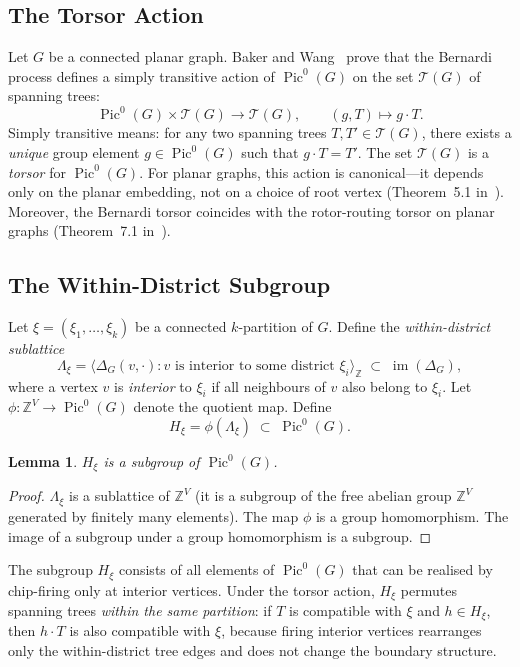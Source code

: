 \documentclass[11pt]{article}
\newtheorem{lemma}{Lemma}[section]
\newcommand{\Z}{\mathbb{Z}}
\newcommand{\Pic}{\operatorname{Pic}^0}
\newcommand{\im}{\operatorname{im}}
\begin{document}
\subsection{The Torsor Action}

Let $G$ be a connected planar graph. Baker and Wang~\cite{baker2018bernardi}
prove that the Bernardi process defines a simply transitive action of
$\Pic(G)$ on the set $\mathcal{T}(G)$ of spanning trees:
\[
  \Pic(G) \times \mathcal{T}(G) \to \mathcal{T}(G),
  \qquad (g, T) \mapsto g \cdot T.
\]
Simply transitive means: for any two spanning trees $T, T' \in \mathcal{T}(G)$,
there exists a \emph{unique} group element $g \in \Pic(G)$ such that
$g \cdot T = T'$. The set $\mathcal{T}(G)$ is a \emph{torsor} for $\Pic(G)$.
For planar graphs, this action is canonical---it depends only on the planar
embedding, not on a choice of root vertex
(Theorem~5.1 in~\cite{baker2018bernardi}). Moreover, the Bernardi torsor
coincides with the rotor-routing torsor on planar graphs
(Theorem~7.1 in~\cite{baker2018bernardi}).

\subsection{The Within-District Subgroup}

Let $\xi = (\xi_1, \ldots, \xi_k)$ be a connected $k$-partition of $G$. Define
the \emph{within-district sublattice}
\[
  \Lambda_\xi = \bigl\langle \Delta_G(v, \cdot) : v \text{ is interior to
    some district } \xi_i \bigr\rangle_{\Z} \;\subset\; \im(\Delta_G),
\]
where a vertex $v$ is \emph{interior} to $\xi_i$ if all neighbours of $v$ also
belong to $\xi_i$. Let $\phi : \Z^V \to \Pic(G)$ denote the quotient map.
Define
\[
  H_\xi = \phi(\Lambda_\xi) \;\subset\; \Pic(G).
\]

\begin{lemma}\label{lem:subgroup}
$H_\xi$ is a subgroup of $\Pic(G)$.
\end{lemma}

\begin{proof}
$\Lambda_\xi$ is a sublattice of $\Z^V$ (it is a subgroup of the free abelian
group $\Z^V$ generated by finitely many elements). The map $\phi$ is a group
homomorphism. The image of a subgroup under a group homomorphism is a
subgroup.
\end{proof}

The subgroup $H_\xi$ consists of all elements of $\Pic(G)$ that can be
realised by chip-firing only at interior vertices. Under the torsor action,
$H_\xi$ permutes spanning trees \emph{within the same partition}: if
$T$ is compatible with $\xi$ and $h \in H_\xi$, then $h \cdot T$ is also
compatible with $\xi$, because firing interior vertices rearranges only the
within-district tree edges and does not change the boundary structure.
\end{document}
